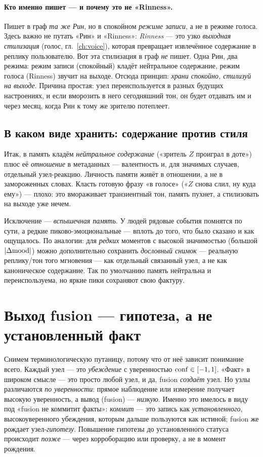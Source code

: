 \paragraph{Кто именно пишет — и почему это не «Rinness».} Пишет в граф \emph{та же
Рин}, но в спокойном \emph{режиме записи}, а не в режиме голоса. Здесь важно не
путать «Рин» и «Rinness»: \emph{Rinness} — это узко \emph{выходная стилизация}
(голос, гл.~\ref{ch:voice}), которая превращает извлечённое содержание в реплику
пользователю. Вот эта стилизация в граф \emph{не} пишет. Одна Рин, два режима: режим
записи (спокойный) кладёт нейтральное содержание, режим голоса (Rinness) звучит на
выходе. Отсюда принцип: \emph{храни спокойно, стилизуй на выходе}. Причина простая:
узел переиспользуется в разных будущих настроениях, и если вморозить в него
сегодняшний тон, он будет отдавать им и через месяц, когда Рин к тому же зрителю
потеплеет.

\subsection*{В каком виде хранить: содержание против стиля}

Итак, в память кладём \emph{нейтральное содержание} («зритель $Z$ проиграл в доте»)
плюс её \emph{отношение} в метаданных — валентность и, для значимых случаев,
отдельный узел-реакцию. Личность памяти живёт в отношении, а не в замороженных
словах. Класть готовую фразу «в голосе» («$Z$ снова слил, ну куда ему») — плохо:
это вмораживает транзиентный тон, память пухнет, а стилизовать на выходе уже нечем.

Исключение — \emph{вспышечная память}. У людей рядовые события помнятся по сути, а
редкие пиково-эмоциональные — вплоть до того, что было сказано и как ощущалось. По
аналогии: для \emph{редких} моментов с высокой значимостью (большой $|\Delta\mathrm{mood}|$)
можно дополнительно сохранить \emph{дословный снимок} — реальную реплику/тон того
мгновения — как отдельный связанный узел, а не как каноническое содержание. Так по
умолчанию память нейтральна и переиспользуема, но яркие пики сохраняют свою фактуру.

\section{Выход fusion — гипотеза, а не установленный факт}

Снимем терминологическую путаницу, потому что от неё зависит понимание всего.
Каждый узел — это \emph{убеждение} с уверенностью $\mathrm{conf}\in[-1,1]$. «Факт» в широком
смысле — это просто любой узел, и да, fusion \emph{создаёт} узел. Но узлы
различаются \emph{по уверенности}: прямое наблюдение или измерение получает высокую
уверенность, а вывод (fusion) — \emph{низкую}. Именно это имелось в виду под «fusion
не коммитит факты»: \emph{коммит} — это запись как \emph{установленного},
высокоуверенного убеждения, которым дальше пользуются как истиной; fusion же рождает
узел-\emph{гипотезу}. Повышение гипотезы до установленного статуса происходит
\emph{позже} — через корроборацию или проверку, а не в момент рождения.

